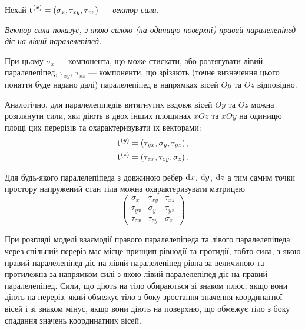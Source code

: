 Нехай $\bf{t}^{(x)} = \left( \sigma_x, \tau_{xy}, \tau_{xz} \right)$ --- \it{вектор сили}.

\begin{definition}
	\it{Вектор сили} показує, з якою силою (на одиницю поверхні) правий паралелепіпед діє на лівий паралелепіпед.
\end{definition}

\begin{remark}
	При цьому $\sigma_x$ --- компонента, що може стискати, або розтягувати лівий паралелепіпед, $\tau_{xy}$, $\tau_{xz}$ --- компоненти, що зрізають (точне визначення цього поняття буде надано далі) паралелепіпед в напрямках вісей $Oy$ та $Oz$ відповідно.
\end{remark}

Аналогічно, для паралелепіпедів витягнутих вздовж вісей $Oy$ та $Oz$ можна розглянути сили, яки діють в двох інших площинах $xOz$ та $xOy$ на одиницю площі цих перерізів та охарактеризувати їх векторами:
\begin{align}
	\bf{t}^{(y)} &= \left( \tau_{yx}, \sigma_y, \tau_{yz} \right), \\
	\bf{t}^{(z)} &= \left( \tau_{zx}, \tau_{zy}, \sigma_z \right).
\end{align}

Для будь-якого паралелепіпеда з довжиною ребер $\diff x$, $\diff y$, $\diff z$ а тим самим точки простору напружений стан тіла можна охарактеризувати матрицею
\begin{equation}
	\label{eq:3.2.3}
	\begin{pmatrix}
		\sigma_x & \tau_{xy} & \tau_{xz} \\
		\tau_{yx} & \sigma_y & \tau_{yz} \\
		\tau_{zx} & \tau_{zy} & \sigma_z
	\end{pmatrix}
\end{equation}

\begin{remark}
	При розгляді моделі взаємодії правого паралелепіпеда та лівого паралелепіпеда через спільний переріз має місце принцип рівнодії та протидії, тобто сила, з якою правий паралелепіпед діє на лівий паралелепіпед рівна за величиною та протилежна за напрямком силі з якою лівий паралелепіпед діє на правий паралелепіпед. Сили, що діють на тіло обираються зі знаком плюс, якщо вони діють на переріз, який обмежує тіло з боку зростання значення координатної вісей і зі знаком мінус, якщо вони діють на поверхню, що обмежує тіло з боку спадання значень координатних вісей.
\end{remark}

